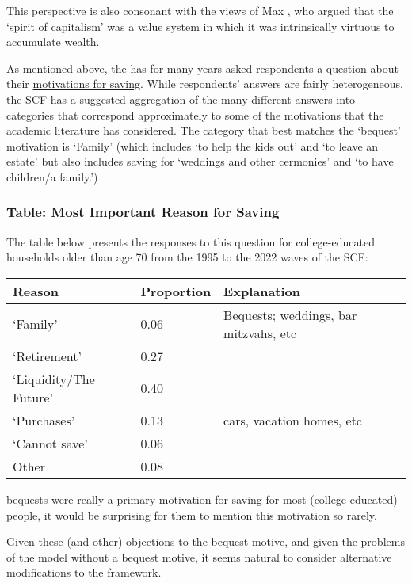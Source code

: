 \documentclass{article}
\begin{document}
This perspective is also consonant with the views of Max \cite{weberCapitalism}, who argued that the `spirit of capitalism' was a value system in which it was intrinsically virtuous to accumulate wealth.


As mentioned above, the \cite{2023} has for many years asked respondents a question about their \href{https://www.federalreserve.gov/econres/files/bulletin.macro.txt}{motivations for saving}. While respondents' answers are fairly heterogeneous, the SCF has a suggested aggregation of the many different answers into categories that correspond approximately to some of the motivations that the academic literature has considered.  The category that best matches the `bequest' motivation is `Family' (which includes `to help the kids out' and `to leave an estate' but also includes saving for `weddings and other cermonies' and  `to have children/a family.')

\subsubsection{Table: Most Important Reason for Saving}\label{most-important-reason}

The table below presents the responses to this question for college-educated households older than age 70 from the 1995 to the 2022 waves of the SCF:

\bigskip\noindent
\begin{tabular}{p{}p{}p{}}
\toprule
Reason & Proportion & Explanation \\
\hline
`Family' & 0.06 & Bequests; weddings, bar mitzvahs, etc \\
`Retirement' & 0.27 &  \\
`Liquidity/The Future' & 0.40 &  \\
`Purchases' & 0.13 & cars, vacation homes, etc \\
`Cannot save' & 0.06 &  \\
Other & 0.08 &  \\
\bottomrule
\end{tabular}

\bigskipIf bequests were really a primary motivation for saving for most (college-educated) people, it would be surprising for them to mention this motivation so rarely.

Given these (and other) objections to the bequest motive, and given the problems of the model without a bequest motive, it seems natural to consider alternative modifications to the framework.
\end{document}
